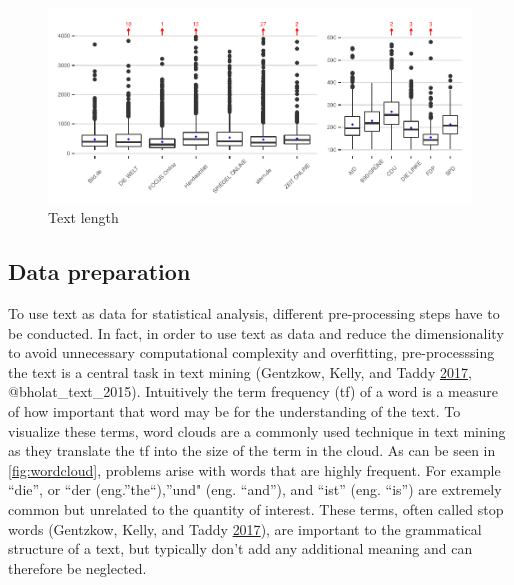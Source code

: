 \documentclass[
]{article}
\begin{document}
\begin{figure}

{\centering \includegraphics[width=1\linewidth]{main_text_files/figure-latex/text_length-1} 

}

\caption{Text length \label{fig:text_length}}\label{fig:text_length}
\end{figure}

\hypertarget{data-preparation}{%
\subsection{Data preparation}\label{data-preparation}}

To use text as data for statistical analysis, different pre-processing
steps have to be conducted. In fact, in order to use text as data and
reduce the dimensionality to avoid unnecessary computational complexity
and overfitting, pre-processsing the text is a central task in text
mining (Gentzkow, Kelly, and Taddy
\protect\hyperlink{ref-gentzkow_text_2017}{2017}, @bholat\_text\_2015).
Intuitively the term frequency (tf) of a word is a measure of how
important that word may be for the understanding of the text. To
visualize these terms, word clouds are a commonly used technique in text
mining as they translate the tf into the size of the term in the cloud.
As can be seen in \autoref{fig:wordcloud}, problems arise with words
that are highly frequent. For example ``die'', or ``der
(eng.''the``),''und" (eng. ``and''), and ``ist'' (eng. ``is'') are
extremely common but unrelated to the quantity of interest. These terms,
often called stop words (Gentzkow, Kelly, and Taddy
\protect\hyperlink{ref-gentzkow_text_2017}{2017}), are important to the
grammatical structure of a text, but typically don't add any additional
meaning and can therefore be neglected.
\end{document}

